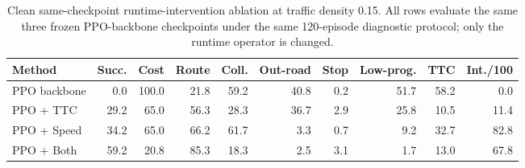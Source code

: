 \begin{table}[!htbp]
\centering
\caption{Clean same-checkpoint runtime-intervention ablation at traffic density 0.15. All rows evaluate the same three frozen PPO-backbone checkpoints under the same 120-episode diagnostic protocol; only the runtime operator is changed.}
\label{tab_clean_runtime_ablation}
\scriptsize
\setlength{\tabcolsep}{2.2pt}
\begin{tabular}{@{}lrrrrrrrrr@{}}
\toprule
Method & Succ. & Cost & Route & Coll. & Out-road & Stop & Low-prog. & TTC & Int./100 \\
\midrule
PPO backbone & 0.0 & 100.0 & 21.8 & 59.2 & 40.8 & 0.2 & 51.7 & 58.2 & 0.0 \\
PPO + TTC & 29.2 & 65.0 & 56.3 & 28.3 & 36.7 & 2.9 & 25.8 & 10.5 & 11.4 \\
PPO + Speed & 34.2 & 65.0 & 66.2 & 61.7 & 3.3 & 0.7 & 9.2 & 32.7 & 82.8 \\
PPO + Both & 59.2 & 20.8 & 85.3 & 18.3 & 2.5 & 3.1 & 1.7 & 13.0 & 67.8 \\
\bottomrule
\end{tabular}
\end{table}
